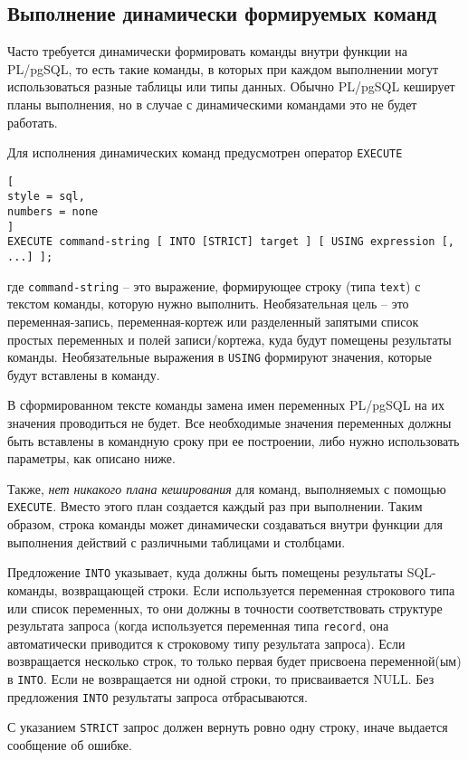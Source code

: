 \documentclass[%
	11pt,
	a4paper,
	utf8,
		]{article}
\begin{document}
\subsection{Выполнение динамически формируемых команд}

Часто требуется динамически формировать команды внутри функции на PL/pgSQL, то есть такие команды, в которых при каждом выполнении могут использоваться разные таблицы или типы данных. Обычно PL/pgSQL кеширует планы выполнения, но в случае с динамическими командами это не будет работать.

Для исполнения динамических команд предусмотрен оператор \texttt{EXECUTE}
\begin{lstlisting}[
style = sql,
numbers = none
]
EXECUTE command-string [ INTO [STRICT] target ] [ USING expression [, ...] ];
\end{lstlisting}
где \texttt{command-string} -- это выражение, формирующее строку (типа \texttt{text}) с текстом команды, которую нужно выполнить. Необязательная цель -- это переменная-запись, переменная-кортеж или разделенный запятыми список простых переменных и полей записи/кортежа, куда будут помещены результаты команды. Необязательные выражения в \texttt{USING} формируют значения, которые будут вставлены в команду.

В сформированном тексте команды замена имен переменных PL/pgSQL на их значения проводиться не будет. Все необходимые значения переменных должны быть вставлены в командную сроку при ее построении, либо нужно использовать параметры, как описано ниже.

Также, \emph{нет никакого плана кеширования} для команд, выполняемых с помощью \texttt{EXECUTE}. Вместо этого план создается каждый раз при выполнении. Таким образом, строка команды может динамически создаваться внутри функции для выполнения действий с различными таблицами и столбцами.

Предложение \texttt{INTO} указывает, куда должны быть помещены результаты SQL-команды, возвращающей строки. Если используется переменная строкового типа или список переменных, то они должны в точности соответствовать структуре результата запроса (когда используется переменная типа \texttt{record}, она автоматически приводится к строковому типу результата запроса). Если возвращается несколько строк, то только первая будет присвоена переменной(ым) в \texttt{INTO}. Если не возвращается ни одной строки, то присваивается NULL. Без предложения \texttt{INTO} результаты запроса отбрасываются.

С указанием \texttt{STRICT} запрос должен вернуть ровно одну строку, иначе выдается сообщение об ошибке.
\end{document}
